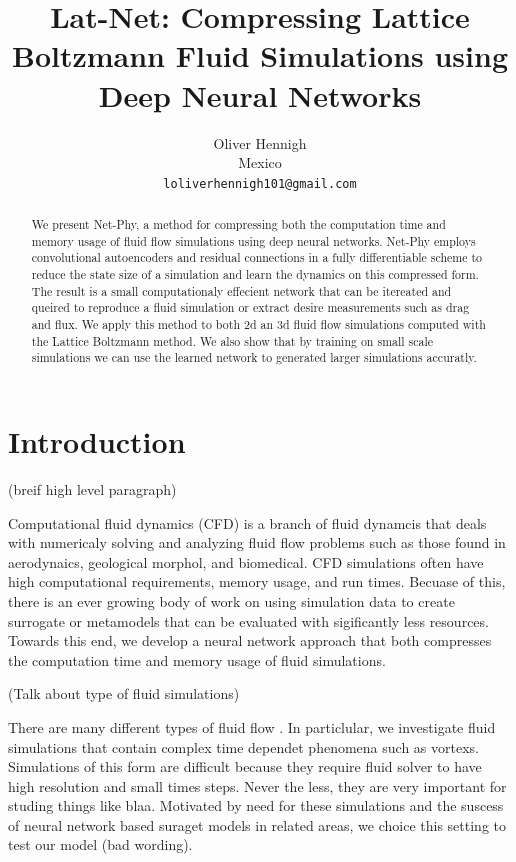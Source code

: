 \documentclass{article}
\title{Lat-Net: Compressing Lattice Boltzmann Fluid Simulations using Deep Neural Networks}
\author{
  Oliver Hennigh \\
  Mexico \\
  \texttt{loliverhennigh101@gmail.com} \\
}
\begin{document}

\maketitle

\begin{abstract}
We present Net-Phy, a method for compressing both the computation time and memory usage of fluid flow simulations using deep neural networks. Net-Phy employs convolutional autoencoders and residual connections in a fully differentiable scheme to reduce the state size of a simulation and learn the dynamics on this compressed form. The result is a small computationaly effecient network that can be itereated and queired to reproduce a fluid simulation or extract desire measurements such as drag and flux. We apply this method to both 2d an 3d fluid flow simulations computed with the Lattice Boltzmann method. We also show that by training on small scale simulations we can use the learned network to generated larger simulations accuratly.

\end{abstract}

\section{Introduction}

(breif high level paragraph)

Computational fluid dynamics (CFD) is a branch of fluid dynamcis that deals with numericaly solving and analyzing fluid flow problems such as those found in aerodynaics, geological morphol, and biomedical. CFD simulations often have high computational requirements, memory usage, and run times. Becuase of this, there is an ever growing body of work on using simulation data to create surrogate or metamodels that can be evaluated with sigificantly less resources. Towards this end, we develop a neural network approach that both compresses the computation time and memory usage of fluid simulations.

(Talk about type of fluid simulations)

There are many different types of fluid flow . In particlular, we investigate fluid simulations that contain complex time dependet phenomena such as vortexs. Simulations of this form are difficult because they require fluid solver to have high resolution and small times steps. Never the less, they are very important for studing things like blaa. Motivated by need for these simulations and the suscess of neural network based suraget models in related areas, we choice this setting to test our model (bad wording).
\end{document}
